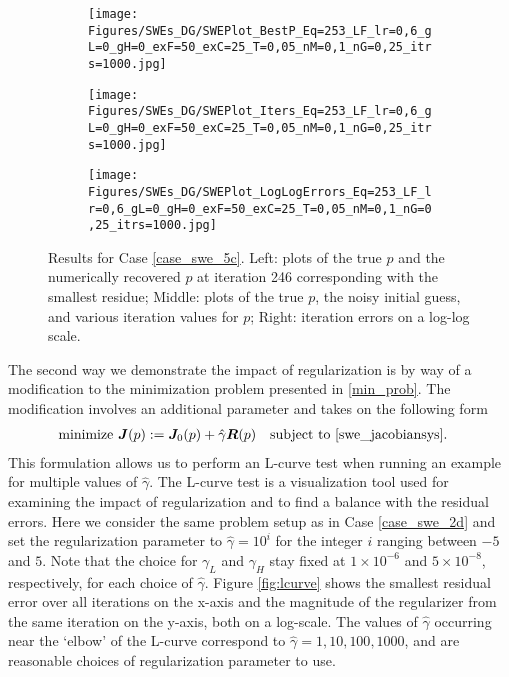 \begin{figure}[h]
    \begin{subfigure}[t]{0.32\textwidth}
        \centering
        \texttt{[image: Figures/SWEs\_DG/SWEPlot\_BestP\_Eq=253\_LF\_lr=0,6\_gL=0\_gH=0\_exF=50\_exC=25\_T=0,05\_nM=0,1\_nG=0,25\_itrs=1000.jpg]}
    \end{subfigure}
    \begin{subfigure}[t]{0.32\textwidth}
        \centering
        \texttt{[image: Figures/SWEs\_DG/SWEPlot\_Iters\_Eq=253\_LF\_lr=0,6\_gL=0\_gH=0\_exF=50\_exC=25\_T=0,05\_nM=0,1\_nG=0,25\_itrs=1000.jpg]}
    \end{subfigure}
    \begin{subfigure}[t]{0.32\textwidth}
        \texttt{[image: Figures/SWEs\_DG/SWEPlot\_LogLogErrors\_Eq=253\_LF\_lr=0,6\_gL=0\_gH=0\_exF=50\_exC=25\_T=0,05\_nM=0,1\_nG=0,25\_itrs=1000.jpg]}
    \end{subfigure}
    \caption{Results for Case \eqref{case_swe_5c}. 
    Left: plots of the true $p$ and the numerically recovered $p$ at iteration 246 corresponding with the smallest residue; Middle: plots of the true $p$, the noisy initial guess, and various iteration values for $p$; Right: iteration errors on a log-log scale.}
    \label{fig:swe_5C}
\end{figure}

The second way we demonstrate the impact of regularization is by way of a modification to the minimization problem presented in \eqref{min_prob}. The modification involves an additional parameter and takes on the following form
\begin{equation} \label{min_prob_new}
    \begin{split}
        & \text{minimize } \bm{J}(p) := \bm{J}_0(p) + \hat{\gamma}\bm{R}(p) \quad \text{subject to } \eqref{swe_jacobiansys}.
    \end{split}
\end{equation}
This formulation allows us to perform an L-curve test \cite{Hansen00thel-curve} when running an example for multiple values of $\hat{\gamma}$. The L-curve test is a visualization tool used for examining the impact of regularization and to find a balance with the residual errors. Here we consider the same problem setup as in Case \eqref{case_swe_2d} and set the regularization parameter to $\hat{\gamma} = 10^i$ for the integer $i$ ranging between $-5$ and $5$. Note that the choice for $\gamma_L$ and $\gamma_H$ stay fixed at $1\times 10^{-6}$ and $5\times 10^{-8}$, respectively, for each choice of $\hat{\gamma}$. Figure \ref{fig:lcurve} shows the smallest residual error over all iterations on the x-axis and the magnitude of the regularizer from the same iteration on the y-axis, both on a log-scale. The values of $\hat{\gamma}$ occurring near the `elbow' of the L-curve correspond to $\hat{\gamma} = 1, 10, 100, 1000$, and are reasonable choices of regularization parameter to use.

